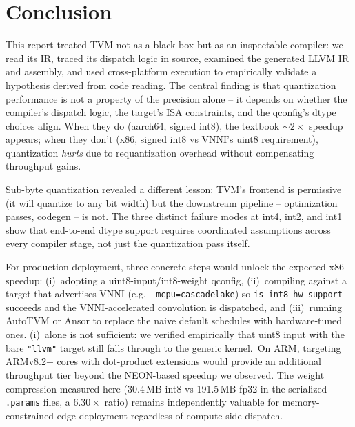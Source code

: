 \documentclass[11pt,a4paper]{article}
\begin{document}
\section{Conclusion}

This report treated TVM not as a black box but as an inspectable compiler: we read its IR, traced its dispatch logic in source, examined the generated LLVM IR and assembly, and used cross-platform execution to empirically validate a hypothesis derived from code reading. The central finding is that quantization performance is not a property of the precision alone -- it depends on whether the compiler's dispatch logic, the target's ISA constraints, and the qconfig's dtype choices align. When they do (aarch64, signed int8), the textbook ${\sim}2\times$ speedup appears; when they don't (x86, signed int8 vs VNNI's uint8 requirement), quantization \emph{hurts} due to requantization overhead without compensating throughput gains.

Sub-byte quantization revealed a different lesson: TVM's frontend is permissive (it will quantize to any bit width) but the downstream pipeline -- optimization passes, codegen -- is not. The three distinct failure modes at int4, int2, and int1 show that end-to-end dtype support requires coordinated assumptions across every compiler stage, not just the quantization pass itself.

For production deployment, three concrete steps would unlock the expected x86 speedup: (i)~adopting a uint8-input/int8-weight qconfig, (ii)~compiling against a target that advertises VNNI (e.g.\ \texttt{-mcpu=cascadelake}) so \texttt{is\_int8\_hw\_support} succeeds and the VNNI-accelerated convolution is dispatched, and (iii)~running AutoTVM or Ansor to replace the naive default schedules with hardware-tuned ones. (i)~alone is not sufficient: we verified empirically that uint8 input with the bare \texttt{"llvm"} target still falls through to the generic kernel.\ On ARM, targeting ARMv8.2+ cores with dot-product extensions would provide an additional throughput tier beyond the NEON-based speedup we observed. The weight compression measured here (30.4\,MB int8 vs 191.5\,MB fp32 in the serialized \texttt{.params} files, a $6.30\times$ ratio) remains independently valuable for memory-constrained edge deployment regardless of compute-side dispatch.
\end{document}
